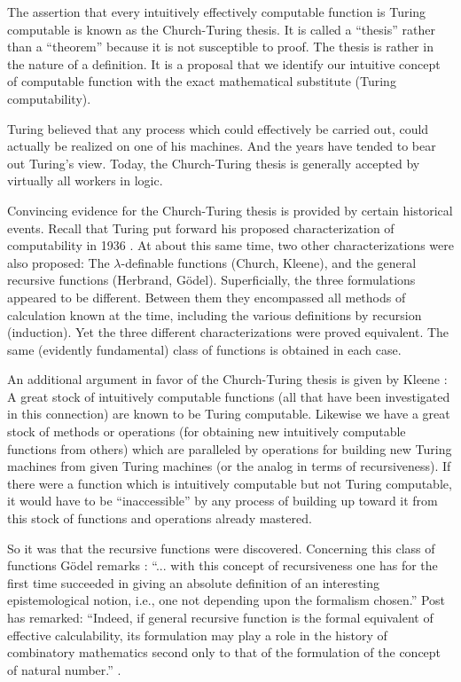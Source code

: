 \documentclass[11pt]{article}
\newcommand{\origpage}[1]{\marginnote{\footnotesize\textbf{[#1]}}}
\begin{document}
The assertion that every intuitively effectively computable function is Turing computable is known as the Church-Turing thesis. It is called a ``thesis'' rather than a ``theorem'' because it is not susceptible to proof. The thesis is rather in the nature of a definition. It is a proposal that we identify our intuitive concept of computable function with the exact mathematical substitute (Turing computability).

Turing believed that any process which could effectively be carried out, could actually be realized on one of his machines. And the years have tended to bear out Turing's view. Today, the Church-Turing thesis is generally accepted by virtually all workers in logic.

Convincing evidence for the Church-Turing thesis is provided by certain historical
events. \origpage{732}Recall that Turing put forward his proposed characterization of computability in 1936 \cite{r42}. At about this same time, two other characterizations were also proposed: The $\lambda$-definable functions (Church, Kleene), and the general recursive functions (Herbrand, Gödel). Superficially, the three formulations appeared to be different. Between them they encompassed all methods of calculation known at the time, including the various definitions by recursion (induction). Yet the three different characterizations were proved equivalent. The same (evidently fundamental) class of functions is obtained in each case.

An additional argument in favor of the Church-Turing thesis is given by Kleene \cite{r18}: A great stock of intuitively computable functions (all that have been investigated in this connection) are known to be Turing computable. Likewise we have a great stock of methods or operations (for obtaining new intuitively computable functions from others) which are paralleled by operations for building new Turing machines from given Turing machines (or the analog in terms of recursiveness). If there were a function which is intuitively computable but not Turing computable, it would have to be ``inaccessible'' by any process of building up toward it from this stock of functions and operations already mastered.

So it was that the recursive functions were discovered. Concerning this class of functions Gödel remarks \cite{r11}: ``... with this concept of recursiveness one has for the first time succeeded in giving an absolute definition of an interesting epistemological notion, i.e., one not depending upon the formalism chosen.'' Post has remarked: ``Indeed, if general recursive function is the formal equivalent of effective calculability, its formulation may play a role in the history of combinatory mathematics second only to that of the formulation of the concept of natural number.'' \cite{r28}.
\end{document}
